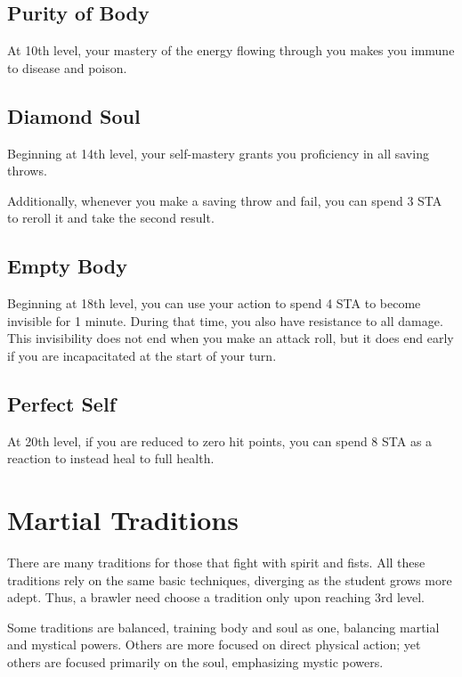 \subsection{Purity of Body}

At 10th level, your mastery of the energy flowing through you makes you immune to disease and poison.

\subsection{Diamond Soul}

Beginning at 14th level, your self-mastery grants you proficiency in all saving throws.

Additionally, whenever you make a saving throw and fail, you can spend 3 STA to reroll it and take the second result.

\subsection{Empty Body}

Beginning at 18th level, you can use your action to spend 4 STA to become invisible for 1 minute. During that time, you also have resistance to all damage. This invisibility does not end when you make an attack roll, but it does end early if you are incapacitated at the start of your turn.

\subsection{Perfect Self}

At 20th level, if you are reduced to zero hit points, you can spend 8 STA as a reaction to instead heal to full health.

\section{Martial Traditions}

There are many traditions for those that fight with spirit and fists. All these traditions rely on the same basic techniques, diverging as the student grows more adept. Thus, a brawler need choose a tradition only upon reaching 3rd level.

Some traditions are balanced, training body and soul as one, balancing martial and mystical powers. Others are more focused on direct physical action; yet others are focused primarily on the soul, emphasizing mystic powers.

